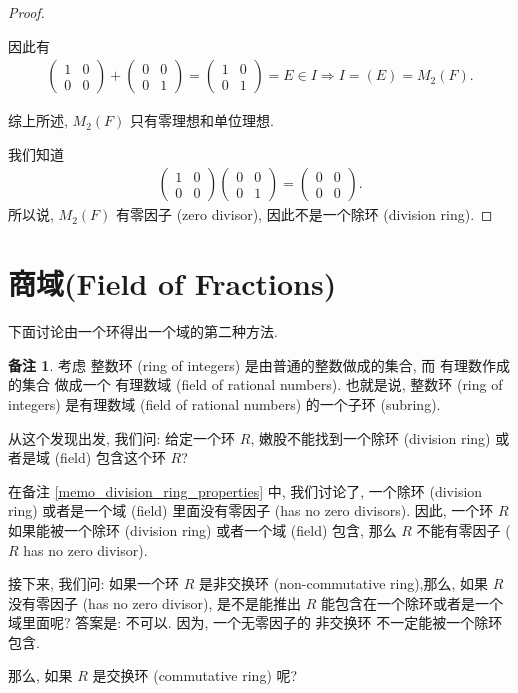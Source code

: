 \documentclass[utf8]{ctexbook}
\theoremstyle{definition}
\newtheorem{memo}{备注}[section]
\begin{document}
\begin{proof}
\begin{itemize}
{因此有
\begin{align*}
\left(
\begin{array}{cc}
1 & 0 \\
0 & 0
\end{array}
\right)
+
\left(
\begin{array}{cc}
0 & 0 \\
0 & 1
\end{array}
\right)
= 
\left(
\begin{array}{cc}
1 & 0 \\
0 & 1
\end{array}
\right)
= E \in I
\Longrightarrow I = (E) = M_{2} (F) .
\end{align*}
}
\end{itemize}
综上所述, $M_{2} (F)$ 只有零理想和单位理想.


我们知道
\begin{align*}
\left(
\begin{array}{cc}
1 & 0 \\
0 & 0
\end{array}
\right)
\left(
\begin{array}{cc}
0 & 0 \\
0 & 1
\end{array}
\right)
=
\left(
\begin{array}{cc}
0 & 0 \\
0 & 0
\end{array}
\right) .
\end{align*}
所以说, $M_{2} (F)$ 有零因子 (zero divisor), 因此不是一个除环 (division ring).

\end{proof}

\section{商域(Field of Fractions)}

下面讨论由一个环得出一个域的第二种方法.

\begin{memo}
考虑 整数环 (ring of integers) 是由普通的整数做成的集合, 而 有理数作成的集合 做成一个 有理数域 (field of rational numbers). 也就是说, 整数环 (ring of integers) 是有理数域 (field of rational numbers) 的一个子环 (subring).

从这个发现出发, 我们问: 给定一个环 $R$, 嫩股不能找到一个除环 (division ring) 或者是域 (field) 包含这个环 $R$?

在备注 \ref{memo_division_ring_properties} 中, 我们讨论了, 一个除环 (division ring) 或者是一个域 (field) 里面没有零因子 (has no zero divisors). 因此, 一个环 $R$ 如果能被一个除环 (division ring) 或者一个域 (field) 包含, 那么 $R$ 不能有零因子 ($R$ has no zero divisor).

接下来, 我们问: 如果一个环 $R$ 是非交换环 (non-commutative ring),那么, 如果 $R$ 没有零因子 (has no zero divisor), 是不是能推出 $R$ 能包含在一个除环或者是一个域里面呢? 答案是: 不可以. 因为, 一个无零因子的 非交换环 不一定能被一个除环包含.

那么, 如果 $R$ 是交换环 (commutative ring) 呢?
\end{memo}
\end{document}
